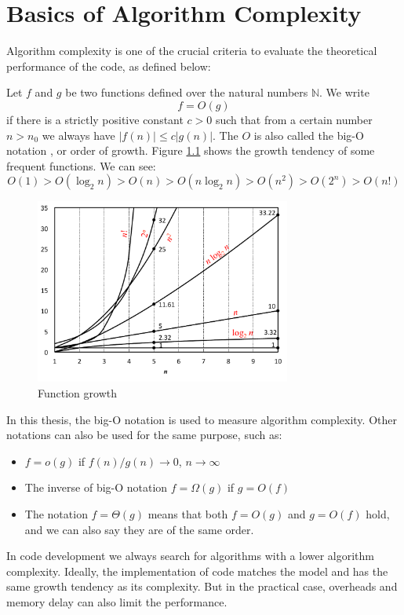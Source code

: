 
\chapter{Basics of Algorithm Complexity\label{chpt:computing-performance}}

Algorithm complexity is one of the crucial criteria to evaluate the theoretical
performance of the code, as defined below:

Let $f$ and $g$ be two functions defined over the natural numbers
$\mathbb{N}$. We write
\begin{equation}
f=O(g)
\end{equation}
if there is a strictly positive constant $c>0$ such that from a certain
number $n>n_{0}$ we always have $\left|f(n)\right|\leq c\left|g(n)\right|$.
The $O$ is also called the big-O notation \citep{Complexity}, or
order of growth. Figure \ref{fig:order-of-growth} shows the growth
tendency of some frequent functions. We can see:
\begin{equation}
O(1)>O(\log_{2}n)>O(n)>O(n\log_{2}n)>O(n^{2})>O(2^{n})>O(n!)
\end{equation}

\begin{figure}[h]
\begin{centering}
\includegraphics[width=0.75\textwidth]{_figure/orders-of-growth}
\par\end{centering}
\caption{Function growth\label{fig:order-of-growth}}
\end{figure}

In this thesis, the big-O notation is used to measure algorithm complexity.
Other notations can also be used for the same purpose, such as:
\begin{itemize}
\item $f=o(g)$ if $f(n)/g(n)\rightarrow0$, $n\rightarrow\infty$
\item The inverse of big-O notation $f=\Omega(g)$ if $g=O(f)$
\item The notation $f=\Theta(g)$ means that both $f=O(g)$ and $g=O(f)$
hold, and we can also say they are of the same order.
\end{itemize}
In code development we always search for algorithms with a lower algorithm
complexity. Ideally, the implementation of code matches the model
and has the same growth tendency as its complexity. But in the practical
case, overheads and memory delay can also limit the performance.
